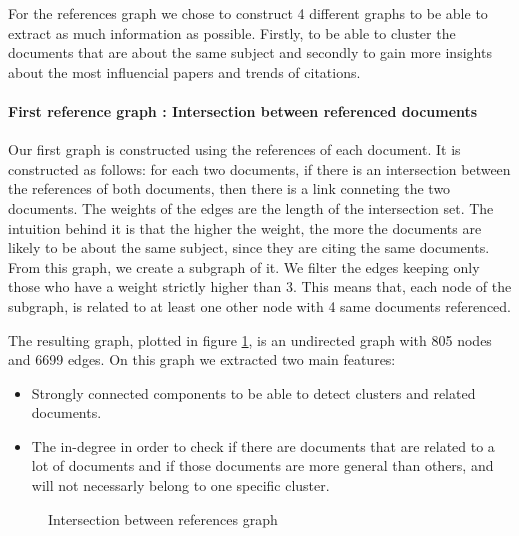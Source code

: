 \documentclass[article,twocolumn]{IEEEtran}
\providecommand{\tightlist}{%
      \setlength{\itemsep}{0pt}\setlength{\parskip}{0pt}}
\begin{document}
For the references graph we chose to construct 4 different graphs to be
able to extract as much information as possible. Firstly, to be able to
cluster the documents that are about the same subject and secondly to
gain more insights about the most influencial papers and trends of
citations.

    \hypertarget{first-reference-graph-intersection-between-referenced-documents}{%
\paragraph{First reference graph : Intersection between referenced
documents}\label{first-reference-graph-intersection-between-referenced-documents}}

Our first graph is constructed using the references of each document. It
is constructed as follows: for each two documents, if there is an
intersection between the references of both documents, then there is a
link conneting the two documents. The weights of the edges are the
length of the intersection set. The intuition behind it is that the
higher the weight, the more the documents are likely to be about the
same subject, since they are citing the same documents. From this graph,
we create a subgraph of it. We filter the edges keeping only those who
have a weight strictly higher than 3. This means that, each node of the
subgraph, is related to at least one other node with 4 same documents
referenced.



    The resulting graph, plotted in figure \ref{intersection}, is an
undirected graph with 805 nodes and 6699 edges. On this graph we
extracted two main features:

\begin{itemize}
\tightlist
\item
  Strongly connected components to be able to detect clusters and
  related documents.
\item
  The in-degree in order to check if there are documents that are
  related to a lot of documents and if those documents are more general
  than others, and will not necessarly belong to one specific cluster.
\end{itemize}


    \begin{figure}
        \begin{center}\end{center}
        \caption{Intersection between references graph}
        \label{intersection}
    \end{figure}
    
\end{document}
